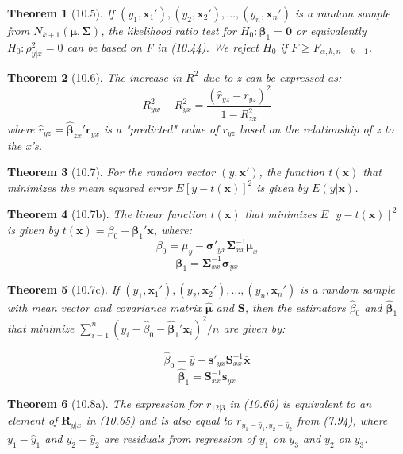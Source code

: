 \documentclass{article}
\newtheorem{theorem}{Theorem}[section]
\begin{document}
\begin{theorem}[10.5]
If $(y_1, \mathbf{x}_1'), (y_2, \mathbf{x}_2'), \ldots, (y_n, \mathbf{x}_n')$ is a random sample from $N_{k+1}(\boldsymbol{\mu}, \boldsymbol{\Sigma})$, the likelihood ratio test for $H_0: \boldsymbol{\beta}_1 = \mathbf{0}$ or equivalently $H_0: \rho^2_{y|x} = 0$ can be based on F in (10.44). We reject $H_0$ if $F \geq F_{\alpha,k,n-k-1}$.
\end{theorem}

\begin{theorem}[10.6]
The increase in $R^2$ due to z can be expressed as:
\[R^2_{yw} - R^2_{yx} = \frac{(\hat{r}_{yz} - r_{yz})^2}{1-R^2_{zx}}\]
where $\hat{r}_{yz} = \hat{\boldsymbol{\beta}}_{zx}'\mathbf{r}_{yx}$ is a "predicted" value of $r_{yz}$ based on the relationship of z to the x's.
\end{theorem}

\begin{theorem}[10.7]
For the random vector $(y, \mathbf{x}')$, the function $t(\mathbf{x})$ that minimizes the mean squared error $E[y - t(\mathbf{x})]^2$ is given by $E(y|\mathbf{x})$.
\end{theorem}

\begin{theorem}[10.7b]
The linear function $t(\mathbf{x})$ that minimizes $E[y - t(\mathbf{x})]^2$ is given by $t(\mathbf{x}) = \beta_0 + \boldsymbol{\beta}_1'\mathbf{x}$, where:
\[\beta_0 = \mu_y - \boldsymbol{\sigma}'_{yx}\boldsymbol{\Sigma}_{xx}^{-1}\boldsymbol{\mu}_x\]
\[\boldsymbol{\beta}_1 = \boldsymbol{\Sigma}_{xx}^{-1}\boldsymbol{\sigma}_{yx}\]
\end{theorem}

\begin{theorem}[10.7c]
If $(y_1, \mathbf{x}_1'), (y_2, \mathbf{x}_2'), \ldots, (y_n, \mathbf{x}_n')$ is a random sample with mean vector and covariance matrix $\hat{\boldsymbol{\mu}}$ and $\mathbf{S}$, then the estimators $\hat{\beta}_0$ and $\hat{\boldsymbol{\beta}}_1$ that minimize $\sum_{i=1}^n(y_i - \hat{\beta}_0 - \hat{\boldsymbol{\beta}}_1'\mathbf{x}_i)^2/n$ are given by:

\[\hat{\beta}_0 = \bar{y} - \mathbf{s}'_{yx}\mathbf{S}_{xx}^{-1}\bar{\mathbf{x}}\]
\[\hat{\boldsymbol{\beta}}_1 = \mathbf{S}_{xx}^{-1}\mathbf{s}_{yx}\]
\end{theorem}

\begin{theorem}[10.8a]
The expression for $r_{12|3}$ in (10.66) is equivalent to an element of $\mathbf{R}_{y|x}$ in (10.65) and is also equal to $r_{y_1-\hat{y}_1,y_2-\hat{y}_2}$ from (7.94), where $y_1 - \hat{y}_1$ and $y_2 - \hat{y}_2$ are residuals from regression of $y_1$ on $y_3$ and $y_2$ on $y_3$.
\end{theorem}
\end{document}
